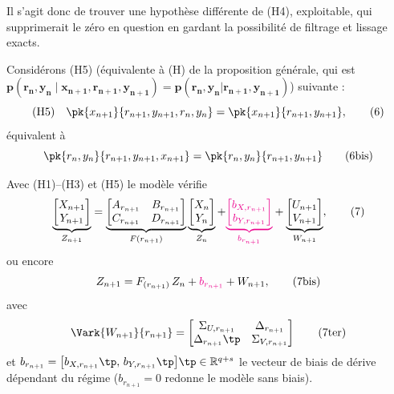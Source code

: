 \documentclass[12pt, a4paper]{article}
\begin{document}
Il s'agit donc de trouver une hypothèse différente de (H4), exploitable, qui supprimerait le
zéro en question en gardant la possibilité de filtrage et lissage exacts.

Considérons (H5) (équivalente à (H) de la proposition générale, qui est
$\bm{p(r_n, y_n \mid x_{n+1}, r_{n+1}, y_{n+1}) = p(r_n, y_n|r_{n+1}, y_{n+1})}$) suivante :
\begin{equation}
  \text{(H5)} \quad
  \pk{x_{n+1}}{r_{n+1}, y_{n+1}, r_n, y_n} = \pk{x_{n+1}}{r_{n+1}, y_{n+1}},
  \tag{6}
\end{equation}
équivalent à
\begin{equation}
  \pk{r_n, y_n}{r_{n+1}, y_{n+1}, x_{n+1}} = \pk{r_n, y_n}{r_{n+1}, y_{n+1}}
  \tag{6bis}
\end{equation}

Avec (H1)--(H3) et (H5) le modèle vérifie
\begin{equation}
  \underbrace{\begin{bmatrix} X_{n+1} \\ Y_{n+1} \end{bmatrix}}_{Z_{n+1}}
  = \underbrace{\begin{bmatrix} A_{r_{n+1}} & B_{r_{n+1}} \\
                                C_{r_{n+1}} & D_{r_{n+1}} \end{bmatrix}}_{F(r_{n+1})}
    \underbrace{\begin{bmatrix} X_n \\ Y_n \end{bmatrix}}_{Z_n}
  + {\color{magenta}\underbrace{\begin{bmatrix} b_{X,r_{n+1}} \\ b_{Y,r_{n+1}} \end{bmatrix}}_{b_{r_{n+1}}}}
  + \underbrace{\begin{bmatrix} U_{n+1} \\ V_{n+1} \end{bmatrix}}_{W_{n+1}},
  \tag{7}
\end{equation}
ou encore
\begin{equation}
  Z_{n+1} = F_{(r_{n+1})}\,Z_n + {\color{magenta}b_{r_{n+1}}} + W_{n+1}, \tag{7bis}
\end{equation}
avec
\begin{equation}
  \Vark{W_{n+1}}{r_{n+1}}
  = \begin{bmatrix}
      \Sigma_{U,r_{n+1}} & \Delta_{r_{n+1}} \\
      \Delta_{r_{n+1}}\tp & \Sigma_{V,r_{n+1}}
    \end{bmatrix} \tag{7ter}
\end{equation}
{\color{magenta}et $b_{r_{n+1}} = \bigl[b_{X,r_{n+1}}\tp,\, b_{Y,r_{n+1}}\tp\bigr]\tp \in \mathbb{R}^{q+s}$
le vecteur de biais de dérive dépendant du régime ($b_{r_{n+1}} = 0$ redonne le modèle sans biais).}
\end{document}
